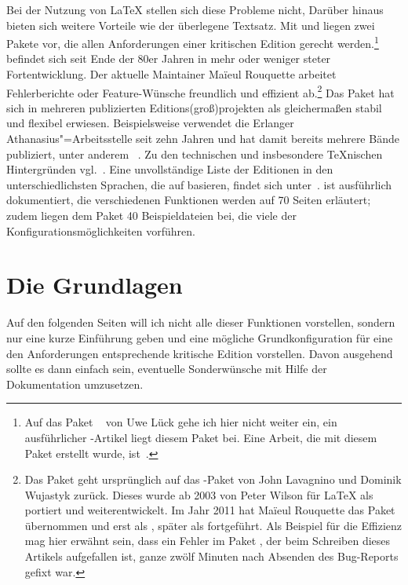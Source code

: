Bei der Nutzung von \LaTeX{} stellen sich diese Probleme nicht, Darüber hinaus bieten sich 
weitere Vorteile wie der überlegene Textsatz. Mit  und \reledmac 
liegen zwei Pakete vor, die allen Anforderungen einer kritischen Edition gerecht 
werden.\footnote{Auf das Paket ~\cite{ednotes} von Uwe Lück gehe ich 
hier nicht weiter ein, ein ausführlicher \TUGboat-Artikel liegt diesem Paket bei. 
Eine Arbeit, die mit diesem Paket erstellt wurde, ist~\cite{mariev:joh_ant}.} 
\reledmac befindet sich seit Ende der 80er Jahren in mehr oder weniger steter Fortentwicklung. 
Der aktuelle Maintainer Maïeul Rouquette arbeitet Fehlerberichte oder Feature-Wünsche 
freundlich und effizient ab.\footnote{Das Paket \reledmac \cite{reledmac} geht 
ursprünglich auf das \plainTeX{}-Paket  von John Lavagnino und 
Dominik Wujastyk zurück. Dieses wurde ab 2003 von Peter Wilson für \LaTeX{} 
als  portiert und weiterentwickelt. Im Jahr 2011 hat Maïeul 
Rouquette das Paket übernommen und erst als , später als \reledmac fortgeführt. 
Als Beispiel für die Effizienz mag hier erwähnt sein, dass ein Fehler im Paket 
\reledmac, der beim Schreiben dieses Artikels aufgefallen ist, ganze zwölf Minuten nach 
Absenden des Bug-Reports gefixt war.} Das Paket hat sich in mehreren publizierten 
Editions(groß)projekten als gleichermaßen stabil und flexibel erwiesen. %
Beispielsweise verwendet die Erlanger Athanasius"=Arbeitsstelle %
seit zehn Jahren 
 und hat damit bereits mehrere Bände publiziert, unter anderem%
~\cite{athanasius_3_1_4}. Zu den technischen und insbesondere \TeX{}nischen 
Hintergründen vgl.~\cite{stockhausen:mde2016/2}. Eine unvollständige Liste der Editionen in den unterschiedlichsten 
Sprachen, die auf  basieren, findet sich unter~\cite{reledmac-benutzung}. 
\reledmac ist 
ausführlich dokumentiert, die verschiedenen Funktionen werden auf 70 Seiten 
erläutert; zudem liegen dem Paket 40 Beispieldateien bei, die viele der 
Konfigurationsmöglichkeiten vorführen.


\section{Die Grundlagen}

Auf den folgenden Seiten will ich nicht alle dieser Funktionen vorstellen, sondern nur eine kurze Einführung geben und eine mögliche Grundkonfiguration für eine den Anforderungen entsprechende kritische Edition vorstellen. 
Davon ausgehend sollte es dann einfach sein, eventuelle Sonderwünsche mit Hilfe der Dokumentation umzusetzen.

